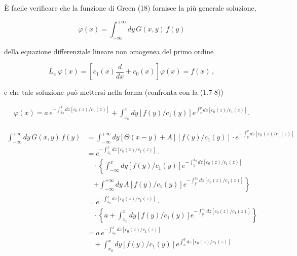 \documentclass[11pt, a4paper]{book}
\numberwithin{equation}{section}
\begin{document}
È facile verificare che la funzione di Green (18) fornisce la più generale soluzione,

\begin{equation}
    \varphi(x) = \int_{-\infty}^{+\infty} dy \, G(x,y) \, f(y)
\end{equation}

della equazione differenziale lineare non omogenea del primo ordine

\begin{equation}
    L_x \, \varphi(x) = \left[ c_1(x) \frac{d}{dx} + c_0(x) \right] \varphi(x) = f(x) \,,
\end{equation}

e che tale soluzione può mettersi nella forma (confronta con la (1.7-8))

\begin{equation}
\begin{aligned}
    \varphi(x) = a \, e^{\displaystyle -\int_{x_0}^{x} dz \left[ c_0(z)/c_1(z) \right]}
    + \int_{x_0}^{x} dy \left[ f(y)/c_1(y) \right] e^{\displaystyle \int_{x}^{y} dz \left[ c_0(z)/c_1(z) \right]}.
\end{aligned}
\end{equation}

\begin{align*}
\int_{-\infty}^{+\infty} dy \, G(x,y) \, f(y)
&= \int_{-\infty}^{+\infty} dy \left[ \Theta(x-y) + A \right] \left[ f(y)/c_1(y) \right]
   \cdot e^{\displaystyle -\int_{y}^{x} dz \left[ c_0(z)/c_1(z) \right]} \\
&= e^{\displaystyle -\int_{x_0}^{x} dz \left[ c_0(z)/c_1(z) \right]} \cdot \\
&\quad \cdot \left\{ \int_{-\infty}^{x} dy \left[ f(y)/c_1(y) \right]
   e^{\displaystyle -\int_{y}^{x_0} dz \left[ c_0(z)/c_1(z) \right]} \right. \\
&\quad \left. + \int_{-\infty}^{+\infty} dy \, A \left[ f(y)/c_1(y) \right]
   e^{\displaystyle -\int_{y}^{x_0} dz \left[ c_0(z)/c_1(z) \right]} \right\} \\
&= e^{\displaystyle -\int_{x_0}^{x} dz \left[ c_0(z)/c_1(z) \right]} \cdot \\
&\quad \cdot \left\{ a + \int_{x_0}^{x} dy \left[ f(y)/c_1(y) \right]
   e^{\displaystyle -\int_{y}^{x_0} dz \left[ c_0(z)/c_1(z) \right]} \right\} \\
&= a \, e^{\displaystyle -\int_{x_0}^{x} dz \left[ c_0(z)/c_1(z) \right]} \\
&\quad + \int_{x_0}^{x} dy \left[ f(y)/c_1(y) \right]
   e^{\displaystyle \int_{x}^{y} dz \left[ c_0(z)/c_1(z) \right]}
\end{align*}
\end{document}
